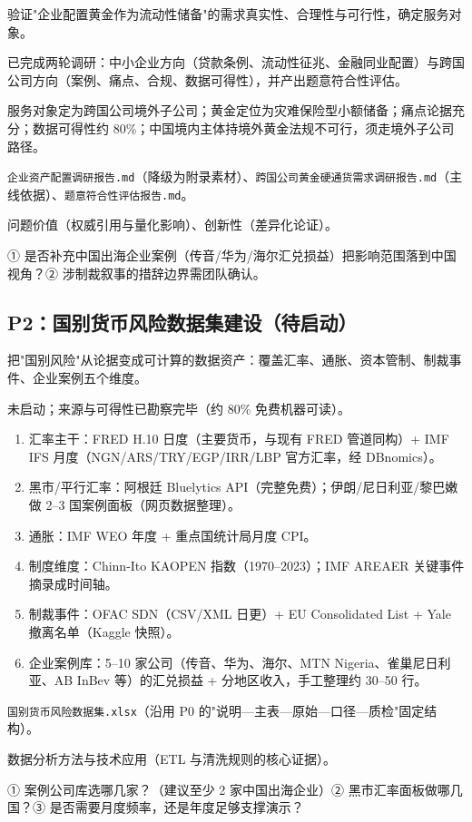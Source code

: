 \documentclass[UTF8,12pt]{ctexart}
\begin{document}
\begin{description}[style=nextline]
\item[目标] 验证"企业配置黄金作为流动性储备"的需求真实性、合理性与可行性，确定服务对象。
\item[现状] 已完成两轮调研：中小企业方向（贷款条例、流动性征兆、金融同业配置）与跨国公司方向（案例、痛点、合规、数据可得性），并产出题意符合性评估。
\item[关键结论] 服务对象定为跨国公司境外子公司；黄金定位为灾难保险型小额储备；痛点论据充分；数据可得性约 80\%；中国境内主体持境外黄金法规不可行，须走境外子公司路径。
\item[产出物] \texttt{企业资产配置调研报告.md}（降级为附录素材）、\texttt{跨国公司黄金硬通货需求调研报告.md}（主线依据）、\texttt{题意符合性评估报告.md}。
\item[对应评分项] 问题价值（权威引用与量化影响）、创新性（差异化论证）。
\item[风险与待决问题] ① 是否补充中国出海企业案例（传音/华为/海尔汇兑损益）把影响范围落到中国视角？② 涉制裁叙事的措辞边界需团队确认。
\end{description}

\subsection{P2：国别货币风险数据集建设（待启动）}

\begin{description}[style=nextline]
\item[目标] 把"国别风险"从论据变成可计算的数据资产：覆盖汇率、通胀、资本管制、制裁事件、企业案例五个维度。
\item[现状] 未启动；来源与可得性已勘察完毕（约 80\% 免费机器可读）。
\item[具体动作]
\begin{enumerate}
\item 汇率主干：FRED H.10 日度（主要货币，与现有 FRED 管道同构）+ IMF IFS 月度（NGN/ARS/TRY/EGP/IRR/LBP 官方汇率，经 DBnomics）。
\item 黑市/平行汇率：阿根廷 Bluelytics API（完整免费）；伊朗/尼日利亚/黎巴嫩做 2--3 国案例面板（网页数据整理）。
\item 通胀：IMF WEO 年度 + 重点国统计局月度 CPI。
\item 制度维度：Chinn-Ito KAOPEN 指数（1970--2023）；IMF AREAER 关键事件摘录成时间轴。
\item 制裁事件：OFAC SDN（CSV/XML 日更）+ EU Consolidated List + Yale 撤离名单（Kaggle 快照）。
\item 企业案例库：5--10 家公司（传音、华为、海尔、MTN Nigeria、雀巢尼日利亚、AB InBev 等）的汇兑损益 + 分地区收入，手工整理约 30--50 行。
\end{enumerate}
\item[产出物] \texttt{国别货币风险数据集.xlsx}（沿用 P0 的"说明—主表—原始—口径—质检"固定结构）。
\item[对应评分项] 数据分析方法与技术应用（ETL 与清洗规则的核心证据）。
\item[风险与待决问题] ① 案例公司库选哪几家？（建议至少 2 家中国出海企业）② 黑市汇率面板做哪几国？③ 是否需要月度频率，还是年度足够支撑演示？
\end{description}
\end{document}
